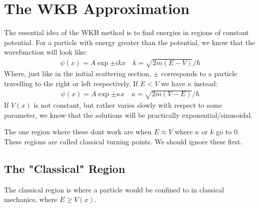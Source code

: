 \section{The WKB Approximation}
The essential idea of the WKB method is to find energies in regions of constant potential. For a particle with energy greater than the potential, we know that the wavefunction will look like:
\begin{align*}
  \psi(x)=A\exp{\pm ikx}\quad k=\sqrt{2m(E-V)}/\hbar
\end{align*}
Where, just like in the initial scattering section, $\pm$ corresponds to a particle travelling to the right or left respectively. If $E<V$ we have $\kappa$ instead:
\begin{align*}
  \psi(x)=A\exp{\pm \kappa x}\quad \kappa=\sqrt{2m(V-E)}/\hbar
\end{align*}
If $V(x)$ is not constant, but rather varies slowly with respect to some parameter, we know that the solutions will be practically exponential/sinusoidal. 

The one region where these dont work are when $E\approx V$ where $\kappa$ or $k$ go to $0$. These regions are called classical turning points. We should ignore these first.
\subsection{The "Classical" Region}
The classical region is where a particle would be confined to in classical mechanics, where $E\geq V(x)$.

